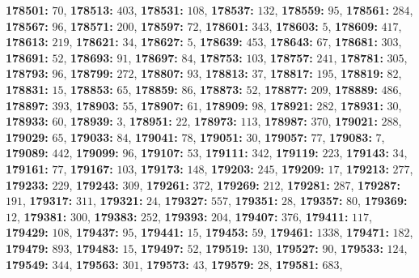 \textsf{\bfseries 178501:} $70$, \textsf{\bfseries 178513:} $403$, \textsf{\bfseries 178531:} $108$, \textsf{\bfseries 178537:} $132$, \textsf{\bfseries 178559:} $95$, \textsf{\bfseries 178561:} $284$, \textsf{\bfseries 178567:} $96$, \textsf{\bfseries 178571:} $200$, \textsf{\bfseries 178597:} $72$, \textsf{\bfseries 178601:} $343$, \textsf{\bfseries 178603:} $5$, \textsf{\bfseries 178609:} $417$, \textsf{\bfseries 178613:} $219$, \textsf{\bfseries 178621:} $34$, \textsf{\bfseries 178627:} $5$, \textsf{\bfseries 178639:} $453$, \textsf{\bfseries 178643:} $67$, \textsf{\bfseries 178681:} $303$, \textsf{\bfseries 178691:} $52$, \textsf{\bfseries 178693:} $91$, \textsf{\bfseries 178697:} $84$, \textsf{\bfseries 178753:} $103$, \textsf{\bfseries 178757:} $241$, \textsf{\bfseries 178781:} $305$, \textsf{\bfseries 178793:} $96$, \textsf{\bfseries 178799:} $272$, \textsf{\bfseries 178807:} $93$, \textsf{\bfseries 178813:} $37$, \textsf{\bfseries 178817:} $195$, \textsf{\bfseries 178819:} $82$, \textsf{\bfseries 178831:} $15$, \textsf{\bfseries 178853:} $65$, \textsf{\bfseries 178859:} $86$, \textsf{\bfseries 178873:} $52$, \textsf{\bfseries 178877:} $209$, \textsf{\bfseries 178889:} $486$, \textsf{\bfseries 178897:} $393$, \textsf{\bfseries 178903:} $55$, \textsf{\bfseries 178907:} $61$, \textsf{\bfseries 178909:} $98$, \textsf{\bfseries 178921:} $282$, \textsf{\bfseries 178931:} $30$, \textsf{\bfseries 178933:} $60$, \textsf{\bfseries 178939:} $3$, \textsf{\bfseries 178951:} $22$, \textsf{\bfseries 178973:} $113$, \textsf{\bfseries 178987:} $370$, \textsf{\bfseries 179021:} $288$, \textsf{\bfseries 179029:} $65$, \textsf{\bfseries 179033:} $84$, \textsf{\bfseries 179041:} $78$, \textsf{\bfseries 179051:} $30$, \textsf{\bfseries 179057:} $77$, \textsf{\bfseries 179083:} $7$, \textsf{\bfseries 179089:} $442$, \textsf{\bfseries 179099:} $96$, \textsf{\bfseries 179107:} $53$, \textsf{\bfseries 179111:} $342$, \textsf{\bfseries 179119:} $223$, \textsf{\bfseries 179143:} $34$, \textsf{\bfseries 179161:} $77$, \textsf{\bfseries 179167:} $103$, \textsf{\bfseries 179173:} $148$, \textsf{\bfseries 179203:} $245$, \textsf{\bfseries 179209:} $17$, \textsf{\bfseries 179213:} $277$, \textsf{\bfseries 179233:} $229$, \textsf{\bfseries 179243:} $309$, \textsf{\bfseries 179261:} $372$, \textsf{\bfseries 179269:} $212$, \textsf{\bfseries 179281:} $287$, \textsf{\bfseries 179287:} $191$, \textsf{\bfseries 179317:} $311$, \textsf{\bfseries 179321:} $24$, \textsf{\bfseries 179327:} $557$, \textsf{\bfseries 179351:} $28$, \textsf{\bfseries 179357:} $80$, \textsf{\bfseries 179369:} $12$, \textsf{\bfseries 179381:} $300$, \textsf{\bfseries 179383:} $252$, \textsf{\bfseries 179393:} $204$, \textsf{\bfseries 179407:} $376$, \textsf{\bfseries 179411:} $117$, \textsf{\bfseries 179429:} $108$, \textsf{\bfseries 179437:} $95$, \textsf{\bfseries 179441:} $15$, \textsf{\bfseries 179453:} $59$, \textsf{\bfseries 179461:} $1338$, \textsf{\bfseries 179471:} $182$, \textsf{\bfseries 179479:} $893$, \textsf{\bfseries 179483:} $15$, \textsf{\bfseries 179497:} $52$, \textsf{\bfseries 179519:} $130$, \textsf{\bfseries 179527:} $90$, \textsf{\bfseries 179533:} $124$, \textsf{\bfseries 179549:} $344$, \textsf{\bfseries 179563:} $301$, \textsf{\bfseries 179573:} $43$, \textsf{\bfseries 179579:} $28$, \textsf{\bfseries 179581:} $683$, 
